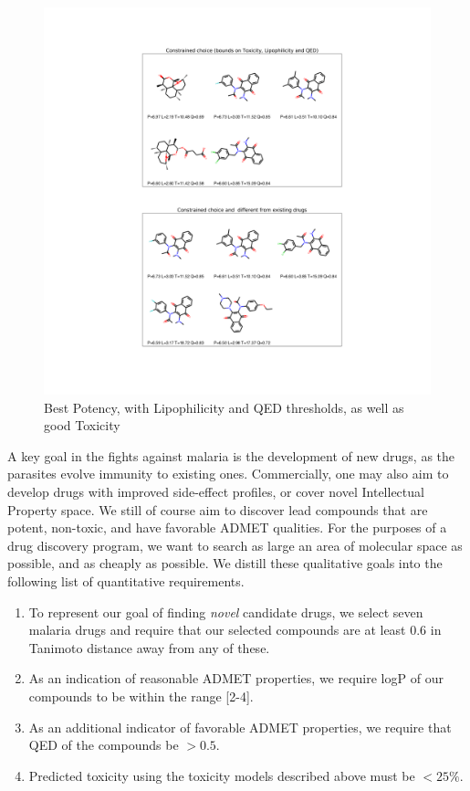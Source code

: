 \documentclass[journal=jacsat,manuscript=article]{achemso}
\begin{document}
\begin{figure}[h!]
\centering
\includegraphics[width=\textwidth]{fig7.png}
\caption{Best Potency, with Lipophilicity and QED thresholds, as well as good Toxicity}
\label{fig:best_q}
\end{figure}

A key goal in the fights against malaria is the development of new drugs, as the parasites evolve immunity to existing ones.  Commercially, one may also aim to develop drugs with improved  side-effect profiles, or cover novel Intellectual Property space.  We still of course aim to discover lead compounds that are potent, non-toxic, and have favorable ADMET qualities.  For the purposes of a drug discovery program, we want to search as large an area of molecular space as possible, and as cheaply as possible. We distill these qualitative goals into the following list of quantitative requirements. 

\begin{enumerate}
    \item To represent our goal of finding \textit{novel} candidate drugs, we select seven malaria drugs and require that our selected compounds are at least 0.6 in Tanimoto distance away from any of these.
    \item As an indication of reasonable ADMET properties, we require logP of our compounds to be within the range [2-4]\cite{Hansch1971}.
    \item As an additional indicator of favorable ADMET properties, we require that QED of the compounds be $> 0.5$.
    \item Predicted toxicity using the toxicity models described above must be $< 25\%$.
\end{enumerate}
\end{document}
